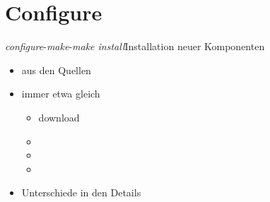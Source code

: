 \section{Configure}
\begin{frame}{{\em configure}-{\em make}-{\em make install}}{Installation neuer Komponenten}
 \begin{itemize}
  \item aus den Quellen
  \item immer etwa gleich
  \begin{itemize}
   \item download
   \item {}
   \item {}
   \item {}
  \end{itemize}
  \item Unterschiede in den Details
 \end{itemize}
\end{frame}

